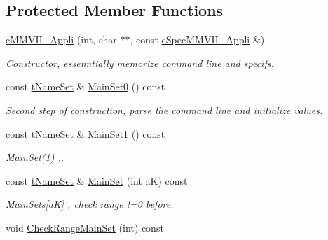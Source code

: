 \subsection*{Protected Member Functions}
\begin{DoxyCompactItemize}
\item 
\hyperlink{classMMVII_1_1cMMVII__Appli_af5f533244cb8c022dead7d658f0d7870}{c\+M\+M\+V\+I\+I\+\_\+\+Appli} (int, char $\ast$$\ast$, const \hyperlink{classMMVII_1_1cSpecMMVII__Appli}{c\+Spec\+M\+M\+V\+I\+I\+\_\+\+Appli} \&)\hypertarget{classMMVII_1_1cMMVII__Appli_af5f533244cb8c022dead7d658f0d7870}{}\label{classMMVII_1_1cMMVII__Appli_af5f533244cb8c022dead7d658f0d7870}

\begin{DoxyCompactList}\small\item\em Constructor, essenntially memorize command line and specifs. \end{DoxyCompactList}\item 
const \hyperlink{classMMVII_1_1cExtSet}{t\+Name\+Set} \& \hyperlink{classMMVII_1_1cMMVII__Appli_aa09befb470e975a559b06c4caaf4411f}{Main\+Set0} () const 
\begin{DoxyCompactList}\small\item\em Second step of construction, parse the command line and initialize values. \end{DoxyCompactList}\item 
const \hyperlink{classMMVII_1_1cExtSet}{t\+Name\+Set} \& \hyperlink{classMMVII_1_1cMMVII__Appli_a084082dd78733800f46fda32fc6e28f3}{Main\+Set1} () const \hypertarget{classMMVII_1_1cMMVII__Appli_a084082dd78733800f46fda32fc6e28f3}{}\label{classMMVII_1_1cMMVII__Appli_a084082dd78733800f46fda32fc6e28f3}

\begin{DoxyCompactList}\small\item\em Main\+Set(1) ,. \end{DoxyCompactList}\item 
const \hyperlink{classMMVII_1_1cExtSet}{t\+Name\+Set} \& \hyperlink{classMMVII_1_1cMMVII__Appli_a20bb7b4dc2b39e9d890c2c98f6c8d8c7}{Main\+Set} (int aK) const \hypertarget{classMMVII_1_1cMMVII__Appli_a20bb7b4dc2b39e9d890c2c98f6c8d8c7}{}\label{classMMVII_1_1cMMVII__Appli_a20bb7b4dc2b39e9d890c2c98f6c8d8c7}

\begin{DoxyCompactList}\small\item\em Main\+Sets\mbox{[}aK\mbox{]} , check range !=0 before. \end{DoxyCompactList}\item 
void \hyperlink{classMMVII_1_1cMMVII__Appli_a0ab3f7ea6bb7775be1ec7e244e5ea6a3}{Check\+Range\+Main\+Set} (int) const \hypertarget{classMMVII_1_1cMMVII__Appli_a0ab3f7ea6bb7775be1ec7e244e5ea6a3}{}\label{classMMVII_1_1cMMVII__Appli_a0ab3f7ea6bb7775be1ec7e244e5ea6a3}


\end{DoxyCompactItemize}
